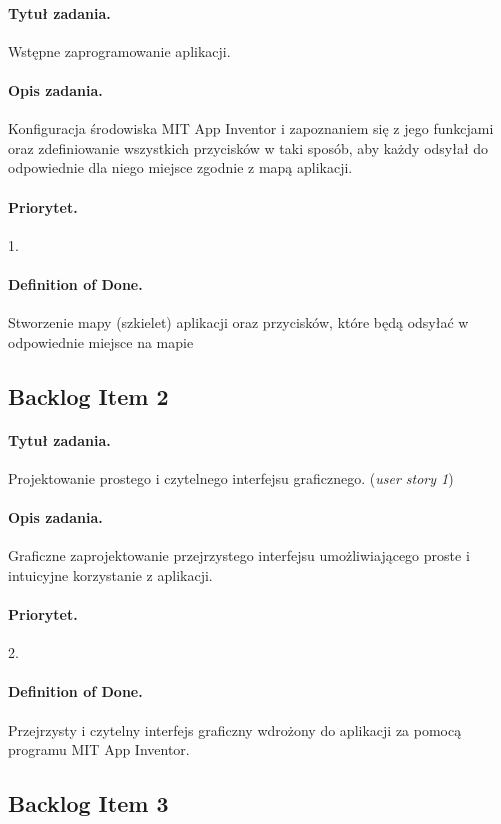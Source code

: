 \documentclass[a4paper]{article}
\begin{document}
\paragraph{Tytuł zadania.} Wstępne zaprogramowanie aplikacji.
\paragraph{Opis zadania.} Konfiguracja środowiska MIT App Inventor i zapoznaniem się z jego funkcjami oraz zdefiniowanie wszystkich przycisków w taki sposób, aby każdy odsyłał do odpowiednie dla niego miejsce zgodnie z mapą aplikacji.
\paragraph{Priorytet.} 1.
\paragraph{Definition of Done.} Stworzenie mapy (szkielet) aplikacji oraz przycisków, które będą odsyłać w odpowiednie miejsce na mapie

\subsection{Backlog Item 2}
\paragraph{Tytuł zadania.} Projektowanie prostego i czytelnego interfejsu graficznego. (\textit{user story 1})
\paragraph{Opis zadania.} Graficzne zaprojektowanie przejrzystego interfejsu umożliwiającego proste i intuicyjne korzystanie z aplikacji.
\paragraph{Priorytet.} 2.
\paragraph{Definition of Done.} Przejrzysty i czytelny interfejs graficzny wdrożony do aplikacji za pomocą programu MIT App Inventor.

\subsection{Backlog Item 3}
\end{document}
